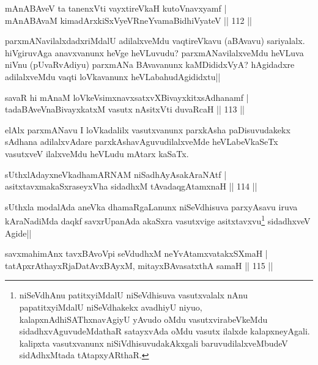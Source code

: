 \begin{shl}
mAnABAveV ta tanenxVti vayxtireVkaH kutoV\s navxyamf |\\
mAnABAvaM kimadArxkiSxVyeVRneYvamaBidhiVyateV \hfill || 112 ||
\end{shl}

\begin{artha}
parxmANavilalxdadxriMdalU adilalxveMdu vaqtireVkavu (aBAvavu) sariyalalx. hiVgiruvAga anavxvanunx heVge heVLuvudu? parxmANavilalxveMdu heVLuva niVnu (pUvaRvAdiyu) parxmANa BAvavanunx kaMDididxVyA? hAgidadxre adilalxveMdu vaqti loVkavanunx heVLabahudAgididxtu||
\end{artha}

\begin{shl}
savaR hi mAnaM loVkeV\s simxnavxsatxvXBivayxkitxsAdhanamf |\\
tadaBAveV\s naBivayxkatxM vasutx nAsitxVti duvaRcaH \hfill || 113 ||
\end{shl}

\begin{artha}
elAlx parxmANavu I loVkadalilx vasutxvanunx parxkAsha paDisuvudakekx sAdhana adilalxvAdare parxkAshavAguvudilalxveMde heVLabeVkaSeTx vasutxveV ilalxveMdu heVLudu mAtarx kaSaTx.
\end{artha}


\begin{shl}
sUthxlAdayxneVkadhamARNAM niSadhAyAsakAraNAtf |\\
asitxtavxmakaSxraseyxVha sidadhxM tAvadaqgAtamxnaH \hfill || 114 ||
\end{shl}

\begin{artha}
sUthxla modalAda aneVka dhamaRgaLanunx niSeVdhisuva parxyAsavu iruva kAraNadiMda daqkf savxrUpanAda akaSxra vasutxvige asitxtavxvu\footnote[3]{niSeVdhAnu patitxyiMdalU niSeVdhisuva vasutxvalalx nAnu papatitxyiMdalU niSeVdhakekx avadhiyU niyuo, kalapxnAdhiSAThxnavAgiyU yAvudo oMdu vasutxvirabeVkeMdu sidadhxvAguvudeMdathaR satayxvAda oMdu vasutx ilalxde kalapxneyAgali. kalipxta vasutxvanunx niSiVdhisuvudakAkxgali baruvudilalxveMbudeV sidAdhxMtada tAtapxyARthaR.} sidadhxveV Agide||
\end{artha}

\begin{shl}
savxmahimAnx tavxBAvoV\s pi seVdudhxM neYvA\s \s tamxvatakxSXmaH |\\
tatApxrAthayxRjaDatAvxBAyxM, mitayxBAvasatxthA samaH \hfill || 115 ||
\end{shl}


